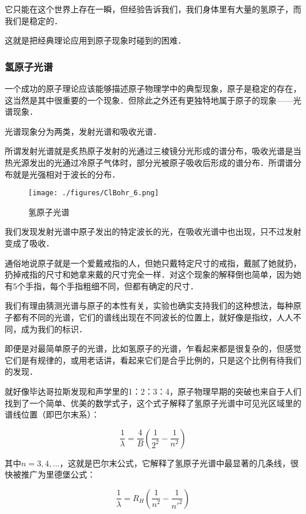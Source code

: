 它只能在这个世界上存在一瞬，但经验告诉我们，我们身体里有大量的氢原子，而我们是稳定的．

这就是把经典理论应用到原子现象时碰到的困难．

\subsubsection{氢原子光谱}


一个成功的原子理论应该能够描述原子物理学中的典型现象，原子是稳定的存在，这当然是其中很重要的一个现象．但除此之外还有更独特地属于原子的现象——光谱现象．

光谱现象分为两类，发射光谱和吸收光谱．

所谓发射光谱就是炙热原子发射的光通过三棱镜分光形成的谱分布，吸收光谱是当热光源发出的光通过冷原子气体时，部分光被原子吸收后形成的谱分布．所谓谱分布就是光强相对于波长的分布．

\begin{figure}[ht]
\centering
\texttt{[image: ./figures/ClBohr\_6.png]}
\caption{氢原子光谱} \label{ClBohr_fig6}
\end{figure}


我们发现发射光谱中原子发出的特定波长的光，在吸收光谱中也出现，只不过发射变成了吸收．

通俗地说原子就是一个爱戴戒指的人，但她只戴特定尺寸的戒指，戴腻了她就扔，扔掉戒指的尺寸和她拿来戴的尺寸完全一样．对这个现象的解释倒也简单，因为她有5个手指，每个手指粗细不同，但都有确定的尺寸．

我们有理由猜测光谱与原子的本性有关，实验也确实支持我们的这种想法，每种原子都有不同的光谱，它们的谱线出现在不同波长的位置上，就好像是指纹，人人不同，成为我们的标识．

即便是对最简单原子的光谱，比如氢原子的光谱，乍看起来都是很复杂的，但感觉它们是有规律的，或用老话讲，看起来它们是合乎比例的，只是这个比例有待我们的发现．

就好像毕达哥拉斯发现和声学里的1：2：3：4，原子物理早期的突破也来自于人们找到了一个简单、优美的数学式子，这个式子解释了氢原子光谱中可见光区域里的谱线位置（即巴尔末系）：

\begin{equation}
\frac{1}{\lambda} = \frac{4}{B} \left( \frac{1}{2^2} - \frac{1}{n^2} \right)
\end{equation}

其中$n = 3, 4, ...$，这就是巴尔末公式，它解释了氢原子光谱中最显著的几条线，很快被推广为里德堡公式：

\begin{equation}
\frac{1}{\lambda} = R_H \left(  \frac{1}{n^2} - \frac{1}{n'^2}  \right)
\end{equation}

